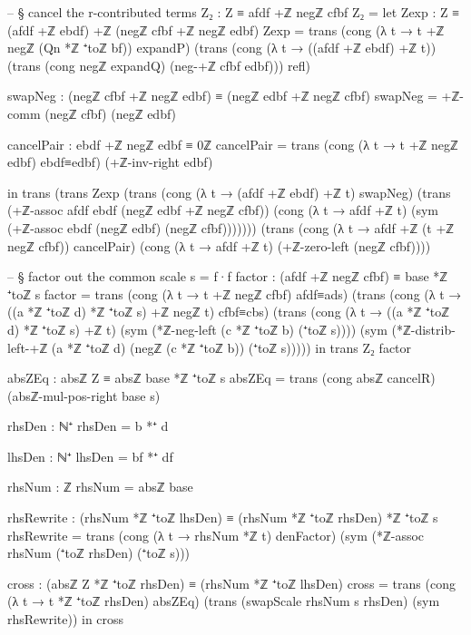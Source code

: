 \documentclass[11pt,a4paper]{book}
\begin{document}
\begin{code}
        -- § cancel the r-contributed terms
        Z₂ : Z ≡ afdf +ℤ negℤ cfbf
        Z₂ =
          let
            Zexp : Z ≡ (afdf +ℤ ebdf) +ℤ (negℤ cfbf +ℤ negℤ edbf)
            Zexp =
              trans
                (cong (λ t → t +ℤ negℤ (Qn *ℤ ⁺toℤ bf)) expandP)
                (trans
                  (cong (λ t → ((afdf +ℤ ebdf) +ℤ t))
                    (trans (cong negℤ expandQ) (neg-+ℤ cfbf edbf)))
                  refl)

            swapNeg : (negℤ cfbf +ℤ negℤ edbf) ≡ (negℤ edbf +ℤ negℤ cfbf)
            swapNeg = +ℤ-comm (negℤ cfbf) (negℤ edbf)

            cancelPair : ebdf +ℤ negℤ edbf ≡ 0ℤ
            cancelPair =
              trans
                (cong (λ t → t +ℤ negℤ edbf) ebdf≡edbf)
                (+ℤ-inv-right edbf)

          in
          trans
            (trans
              Zexp
              (trans
                (cong (λ t → (afdf +ℤ ebdf) +ℤ t) swapNeg)
                (trans
                  (+ℤ-assoc afdf ebdf (negℤ edbf +ℤ negℤ cfbf))
                  (cong (λ t → afdf +ℤ t) (sym (+ℤ-assoc ebdf (negℤ edbf) (negℤ cfbf)))))))
            (trans
              (cong (λ t → afdf +ℤ (t +ℤ negℤ cfbf)) cancelPair)
              (cong (λ t → afdf +ℤ t) (+ℤ-zero-left (negℤ cfbf))))

        -- § factor out the common scale s = f·f
        factor : (afdf +ℤ negℤ cfbf) ≡ base *ℤ ⁺toℤ s
        factor =
          trans
            (cong (λ t → t +ℤ negℤ cfbf) afdf≡ads)
            (trans
              (cong (λ t → ((a *ℤ ⁺toℤ d) *ℤ ⁺toℤ s) +ℤ negℤ t) cfbf≡cbs)
              (trans
                (cong (λ t → ((a *ℤ ⁺toℤ d) *ℤ ⁺toℤ s) +ℤ t)
                  (sym (*ℤ-neg-left (c *ℤ ⁺toℤ b) (⁺toℤ s))))
                (sym (*ℤ-distrib-left-+ℤ (a *ℤ ⁺toℤ d) (negℤ (c *ℤ ⁺toℤ b)) (⁺toℤ s)))))
      in
      trans Z₂ factor

    absZEq : absℤ Z ≡ absℤ base *ℤ ⁺toℤ s
    absZEq = trans (cong absℤ cancelR) (absℤ-mul-pos-right base s)

    rhsDen : ℕ⁺
    rhsDen = b *⁺ d

    lhsDen : ℕ⁺
    lhsDen = bf *⁺ df

    rhsNum : ℤ
    rhsNum = absℤ base

    rhsRewrite : (rhsNum *ℤ ⁺toℤ lhsDen) ≡ (rhsNum *ℤ ⁺toℤ rhsDen) *ℤ ⁺toℤ s
    rhsRewrite =
      trans
        (cong (λ t → rhsNum *ℤ t) denFactor)
        (sym (*ℤ-assoc rhsNum (⁺toℤ rhsDen) (⁺toℤ s)))

    cross : (absℤ Z *ℤ ⁺toℤ rhsDen) ≡ (rhsNum *ℤ ⁺toℤ lhsDen)
    cross =
      trans
        (cong (λ t → t *ℤ ⁺toℤ rhsDen) absZEq)
        (trans
          (swapScale rhsNum s rhsDen)
          (sym rhsRewrite))
  in
  cross
\end{code}
\end{document}
